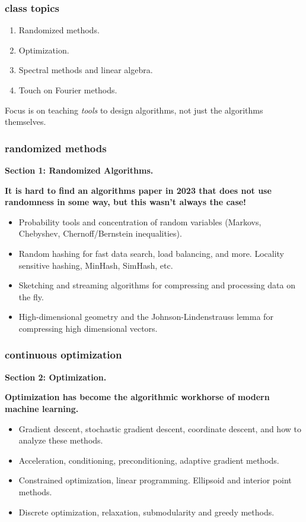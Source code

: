 \documentclass[]{beamer}
\begin{document}
	\begin{frame}
		\frametitle{class topics}
		\begin{center}
			\begin{enumerate}[label=(\arabic*)]
				\item Randomized methods.
				\item Optimization.
				\item Spectral methods and linear algebra.
				\item Touch on Fourier methods.
			\end{enumerate}
			
			\vspace{1em}
			Focus is on teaching \emph{tools} to design algorithms, not just the algorithms themselves. 
		\end{center}
	\end{frame}
	
	\begin{frame}
		\frametitle{randomized methods}
		\small
		\textbf{Section 1: Randomized Algorithms.}
		
		\alert{\textbf{It is hard to find an algorithms paper in 2023 that does not use randomness in some way, but this wasn't always the case!}}
		\begin{itemize}
			\item Probability tools and concentration of random variables (Markovs, Chebyshev, Chernoff/Bernstein inequalities).
			\item Random hashing for fast data search, load balancing, and more. Locality sensitive hashing, MinHash, SimHash, etc.
			\item Sketching and streaming algorithms for compressing and processing data on the fly.
			\item High-dimensional geometry and the Johnson-Lindenstrauss lemma for compressing high dimensional vectors.
		\end{itemize}
	\end{frame}
	
	\begin{frame}
		\frametitle{continuous optimization}
		\small
		\textbf{Section 2: Optimization.}
		
		\alert{\textbf{Optimization has become the algorithmic workhorse of modern machine learning.}}
		\begin{itemize}
			\item Gradient descent, stochastic gradient descent, coordinate descent, and how to analyze these methods.
			\item Acceleration, conditioning, preconditioning, adaptive gradient methods.
			\item Constrained optimization, linear programming. Ellipsoid and interior point methods.
			\item Discrete optimization, relaxation, submodularity and greedy methods.
		\end{itemize}
	\end{frame}
	
\end{document}
